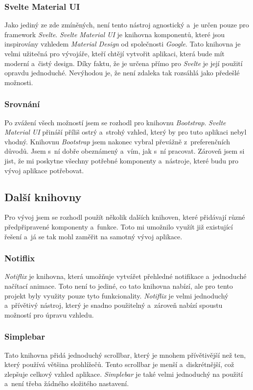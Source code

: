 \subsubsection*{Svelte Material UI}
Jako jediný ze zde zmíněných, není tento nástroj agnostický a~je určen pouze pro framework \textit{Svelte}. \textit{Svelte Material UI} je knihovna komponentů, které jsou inspirovány vzhledem \textit{Material Design} od společnosti \textit{Google}. Tato knihovna je velmi užitečná pro vývojáře, kteří chtějí vytvořit aplikaci, která bude mít moderní a~čistý design. Díky faktu, že je určena přímo pro \textit{Svelte} je její použití opravdu jednoduché. Nevýhodou je, že není zdaleka tak rozsáhlá jako předešlé možnosti. \cite{svelte_material_ui}

\subsubsection*{Srovnání}
Po zvážení všech možností jsem se rozhodl pro knihovnu \textit{Bootstrap}. \textit{Svelte Material UI} přináší příliš ostrý a~strohý vzhled, který by pro tuto aplikaci nebyl vhodný. Knihovnu \textit{Bootstrap} jsem nakonec vybral převážně z~preferenčních důvodů. Jsem s~ní dobře obeznámený a~vím, jak s~ní pracovat. Zároveň jsem si jist, že mi poskytne všechny potřebné komponenty a~nástroje, které budu pro vývoj aplikace potřebovat.

\subsection{Další knihovny}
Pro vývoj jsem se rozhodl použít několik dalších knihoven, které přidávají různé předpřipravené komponenty a~funkce. Toto mi umožnilo využít již existující řešení a~já se tak mohl zaměřit na samotný vývoj aplikace.

\subsubsection*{Notiflix}
\textit{Notiflix} je knihovna, která umožňuje vytvářet přehledné notifikace a~jednoduché načítací animace. Toto není to jediné, co tato knihovna nabízí, ale pro tento projekt byly využity pouze tyto funkcionality. \textit{Notiflix} je velmi jednoduchý a~přívětivý nástroj, který je snadno použitelný a~zároveň nabízí spoustu možností pro úpravu vzhledu. \cite{notiflix}

\subsubsection*{Simplebar}
Tato knihovna přidá jednoduchý scrollbar, který je mnohem přívětivější než ten, který používá většina prohlížečů. Tento scrollbar je menší a~diskrétnější, což zlepšuje celkový vzhled aplikace. \textit{Simplebar} je také velmi jednoduchý na použití a~není třeba žádného složitého nastavení. \cite{simplebar}

